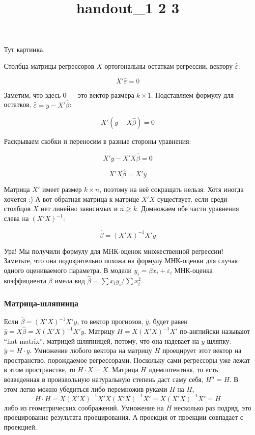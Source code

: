 \documentclass[]{article}
\title{handout\_1 2 3}
\author{}
\date{}
\begin{document}
\maketitle


{
\hypersetup{linkcolor=black}
\setcounter{tocdepth}{3}
\tableofcontents
}
Тут картинка.

Столбца матрицы регрессоров $X$ ортогональны остаткам регрессии, вектору
$\hat{\varepsilon}$:

\[
X'\hat{\varepsilon}=0
\]

Заметим, что здесь 0 --- это вектор размера $k\times 1$. Подставляем
формулу для остатков, $\hat{\varepsilon}=y-X'\hat{\beta}$:

\[
X'(y-X\hat{\beta})=0
\]

Раскрываем скобки и переносим в разные стороны уравнения:

\[
X'y-X'X\hat{\beta}=0
\]

\[
X'X\hat{\beta}=X'y
\]

Матрица $X'$ имеет размер $k\times n$, поэтому на неё сокращать нельзя.
Хотя иногда хочется :) А вот обратная матрица к матрице $X'X$
существует, если среди столбцов $X$ нет линейно зависимых и $n\geq k$.
Домножаем обе части уравнения слева на $(X'X)^{-1}$:

\[
\hat{\beta}=(X'X)^{-1}X'y
\]

Ура! Мы получили формулу для МНК-оценок множественной регрессии!
Заметьте, что она подозрительно похожа на формулу МНК-оценки для случая
одного оцениваемого параметра. В модели $y_i=\beta x_i +\varepsilon_i$
МНК-оценка коэффициента $\beta$ имела вид
$\hat{\beta}=\sum x_i y_i /\sum x_i^2$.

\subsubsection{Матрица-шляпница}\label{-}

Если $\hat{\beta}=(X'X)^{-1}X'y$, то вектор прогнозов, $\hat{y}$, будет
равен $\hat{y}=X\hat{\beta}=X(X'X)^{-1}X'y$. Матрицу $H=X(X'X)^{-1}X'$
по-английски называют ``hat-matrix'', матрицей-шляпницей, потому, что
она надевает на $y$ шляпку: $\hat{y}=H\cdot y$. Умножение любого вектора
на матрицу $H$ проецирует этот вектор на пространство, порождаемое
регрессорами. Поскольку сами регрессоры уже лежат в этом пространстве,
то $H\cdot X=X$. Матрица $H$ идемпотентная, то есть возведенная в
произвольную натуральную степень даст саму себя, $H^n=H$. В этом легко
можно убедиться либо перемножив руками $H$ на $H$, \[
H\cdot H=X(X'X)^{-1}X'X(X'X)^{-1}X'=X(X'X)^{-1}X'=H
\] либо из геометрических соображений. Умножение на $H$ несколько раз
подряд, это проецирование результата проецирования. А проекция от
проекции совпадает с проекцией.
\end{document}
